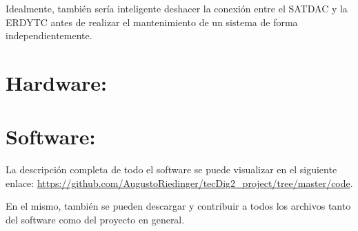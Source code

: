 \documentclass[conference]{IEEEtran}
\begin{document}
Idealmente, también sería inteligente deshacer la conexión entre el SATDAC y la ERDYTC antes de realizar el mantenimiento de un sistema de forma independientemente.
\section{Hardware:}
\label{sec:orgedc7963}
\section{Software:}
\label{sec:org9cba68d}
La descripción completa de todo el software se puede visualizar en el siguiente enlace: \url{https://github.com/AugustoRiedinger/tecDig2\_project/tree/master/code}.

En el mismo, también se pueden descargar y contribuir a todos los archivos tanto del software como del proyecto en general.
\end{document}
